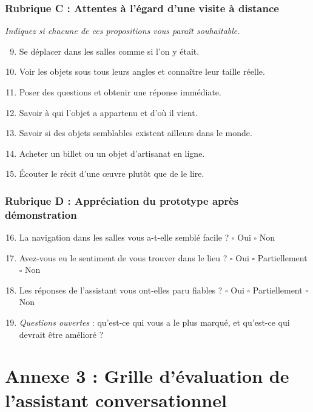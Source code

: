 \subsection*{Rubrique C : Attentes à l'égard d'une visite à distance}

\emph{Indiquez si chacune de ces propositions vous paraît souhaitable.}

\begin{enumerate}\setcounter{enumi}{8}
  \item Se déplacer dans les salles comme si l'on y était.
  \item Voir les objets sous tous leurs angles et connaître leur taille réelle.
  \item Poser des questions et obtenir une réponse immédiate.
  \item Savoir à qui l'objet a appartenu et d'où il vient.
  \item Savoir si des objets semblables existent ailleurs dans le monde.
  \item Acheter un billet ou un objet d'artisanat en ligne.
  \item Écouter le récit d'une œuvre plutôt que de le lire.
\end{enumerate}

\subsection*{Rubrique D : Appréciation du prototype après démonstration}

\begin{enumerate}\setcounter{enumi}{15}
  \item La navigation dans les salles vous a-t-elle semblé facile ? \quad
        $\square$ Oui \quad $\square$ Non
  \item Avez-vous eu le sentiment de vous trouver dans le lieu ? \quad
        $\square$ Oui \quad $\square$ Partiellement \quad $\square$ Non
  \item Les réponses de l'assistant vous ont-elles paru fiables ? \quad
        $\square$ Oui \quad $\square$ Partiellement \quad $\square$ Non
  \item \emph{Questions ouvertes} : qu'est-ce qui vous a le plus marqué, et
        qu'est-ce qui devrait être amélioré ?
\end{enumerate}

\chapter*{Annexe 3 : Grille d'évaluation de l'assistant conversationnel}
\label{ann:grille}

